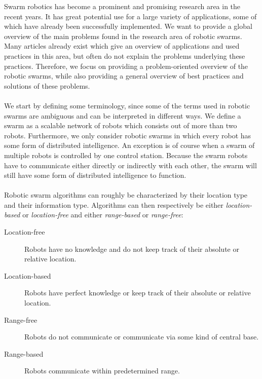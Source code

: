 
Swarm robotics has become a prominent and promising research area in the recent years. 
It has great potential use for a large variety of applications, some of which have already been successfully implemented. 
We want to provide a global overview of the main problems found in the research area of robotic swarms. 
Many articles already exist which give an overview of applications and used practices in this area, but often do not explain the problems underlying these practices. 
Therefore, we focus on providing a problem-oriented overview of the robotic swarms, while also providing a general overview of best practices and solutions of these problems.\\
\\
We start by defining some terminology, since some of the terms used in robotic swarms are ambiguous and can be interpreted in different ways.
We define a swarm as a scalable network of robots which consists out of more than two robots.
Furthermore, we only consider robotic swarms in which every robot has some form of distributed intelligence.
An exception is of course when a swarm of multiple robots is controlled by one control station.
Because the swarm robots have to communicate either directly or indirectly with each other, the swarm will still have some form of distributed intelligence to function.
\\
\\
Robotic swarm algorithms can roughly be characterized by their location type and their information type. Algorithms can then respectively be either \emph{location-based} or \emph{location-free} and either \emph{range-based} or \emph{range-free}:
\begin{description}
	\item[Location-free] Robots have no knowledge and do not keep track of their absolute or relative location.
	\item[Location-based] Robots have perfect knowledge or keep track of their absolute or relative location.
	\item[Range-free] Robots do not communicate or communicate via some kind of central base.
	\item[Range-based] Robots communicate within predetermined range.
\end{description}


